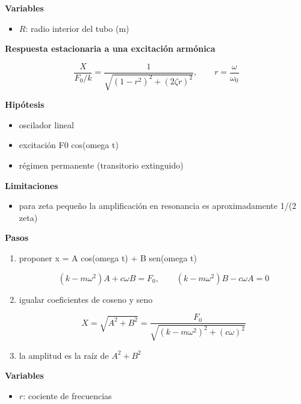\documentclass[10pt,openany]{book}
\begin{document}
\begin{tcolorbox}[title={Desarrollos del modelo}, studiumdef, breakable]
\noindent\textbf{Variables}
\begin{itemize}
\item $R$: radio interior del tubo ($\mathrm{m}$)
\end{itemize}



\noindent\textbf{Respuesta estacionaria a una excitación armónica}

\[
\frac{X}{F_0/k} = \frac{1}{\sqrt{\left(1 - r^{2}\right)^{2} + \left(2\zeta r\right)^{2}}},\qquad r = \frac{\omega}{\omega_0}
\]

\noindent\textbf{Hipótesis}
\begin{itemize}
\item oscilador lineal
\item excitación F0 cos(omega t)
\item régimen permanente (transitorio extinguido)
\end{itemize}

\noindent\textbf{Limitaciones}
\begin{itemize}
\item para zeta pequeño la amplificación en resonancia es aproximadamente 1/(2 zeta)
\end{itemize}

\noindent\textbf{Pasos}
\begin{enumerate}
\item
proponer x = A cos(omega t) + B sen(omega t)

\[
(k - m\omega^{2})A + c\omega B = F_0,\qquad (k - m\omega^{2})B - c\omega A = 0
\]
\item
igualar coeficientes de coseno y seno

\[
X = \sqrt{A^{2} + B^{2}} = \frac{F_0}{\sqrt{(k - m\omega^{2})^{2} + (c\omega)^{2}}}
\]
\item
la amplitud es la raíz de \(A^2 + B^2\)
\end{enumerate}

\noindent\textbf{Variables}
\begin{itemize}
\item $r$: cociente de frecuencias
\end{itemize}


\end{tcolorbox}
\end{document}
